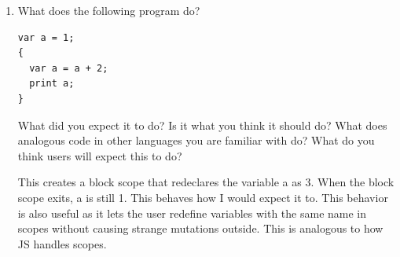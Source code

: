 \documentclass{article}
\begin{document}
\begin{enumerate}
{        This can be done by adding a HashSet that tracks which variables have been 
        initialized.

        \begin{lstlisting}
package com.mylox.lox;

import java.util.HashMap;
import java.util.HashSet;
import java.util.Map;
import java.util.Set;

class Environment {
    final Environment enclosing;
    private final Map<String, Object> values = new HashMap<>();
    private final Set<String> initialized = new HashSet<>();

    Environment() {
        this.enclosing = null;
    }

    Environment(Environment enclosing) {
        this.enclosing = enclosing;
    }

    void define(String name, Object value) {
        values.put(name, value);
        if (value != null) initialized.add(name);
    }

    Object get(Token name) {
        if (values.containsKey(name.lexeme)) {
            if (!initialized.contains(name.lexeme)) {
                throw new RuntimeError(name, "Variable not initialized.");
            }
            return values.get(name.lexeme);
        }

        if (enclosing != null) return enclosing.get(name);

        throw new RuntimeError(name,
                "Undefined variable '" + name.lexeme + "'.");
    }

    void assign(Token name, Object value) {
        if (values.containsKey(name.lexeme)) {
            values.put(name.lexeme, value);
            initialized.add(name.lexeme);
            return;
        }

        if (enclosing != null) {
            enclosing.assign(name, value);
            return;
        }

        throw new RuntimeError(name, "Undefined variable '" + name.lexeme + "'.");
    }
}
        \end{lstlisting}
    }

    \item {
        What does the following program do?

        \begin{lstlisting}
var a = 1;
{
  var a = a + 2;
  print a;
}
        \end{lstlisting}
        What did you expect it to do? Is it what you think it should do? What does analogous code in other languages you are familiar with do? What do you think users will expect this to do?

        This creates a block scope that redeclares the variable a as 3. When the 
        block scope exits, a is still 1. This behaves how I would expect it to.
        This behavior is also useful as it lets the user redefine variables with 
        the same name in scopes without causing strange mutations outside. This 
        is analogous to how JS handles scopes.

    }
\end{enumerate}
\end{document}
